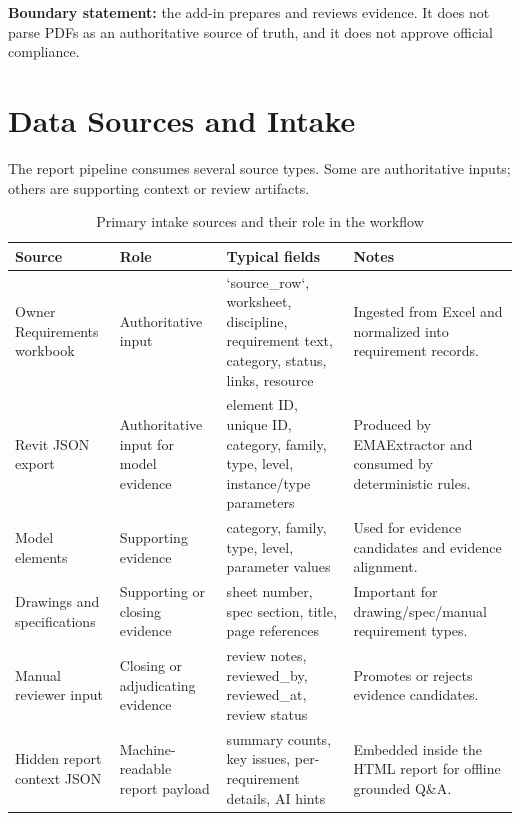 \documentclass[10pt,letterpaper]{article}
\newcommand{\strong}[1]{\textbf{\textcolor{emaNavy}{#1}}}
\begin{document}
\begin{tcolorbox}[colback=emaSoft]
\strong{Boundary statement:} the add-in prepares and reviews evidence. It does not parse PDFs as an authoritative source of truth, and it does not approve official compliance.
\end{tcolorbox}

\section{Data Sources and Intake}

The report pipeline consumes several source types. Some are authoritative inputs; others are supporting context or review artifacts.

\begin{longtable}{p{1.7in}p{1.35in}p{1.85in}p{1.9in}}
\caption{Primary intake sources and their role in the workflow}\label{tab:data-sources}\\
\toprule
\textbf{Source} & \textbf{Role} & \textbf{Typical fields} & \textbf{Notes} \\
\midrule
\endhead
Owner Requirements workbook & Authoritative input & `source_row`, worksheet, discipline, requirement text, category, status, links, resource & Ingested from Excel and normalized into requirement records. \\
Revit JSON export & Authoritative input for model evidence & element ID, unique ID, category, family, type, level, instance/type parameters & Produced by EMAExtractor and consumed by deterministic rules. \\
Model elements & Supporting evidence & category, family, type, level, parameter values & Used for evidence candidates and evidence alignment. \\
Drawings and specifications & Supporting or closing evidence & sheet number, spec section, title, page references & Important for drawing/spec/manual requirement types. \\
Manual reviewer input & Closing or adjudicating evidence & review notes, reviewed_by, reviewed_at, review status & Promotes or rejects evidence candidates. \\
Hidden report context JSON & Machine-readable report payload & summary counts, key issues, per-requirement details, AI hints & Embedded inside the HTML report for offline grounded Q\&A. \\
\bottomrule
\end{longtable}
\end{document}

